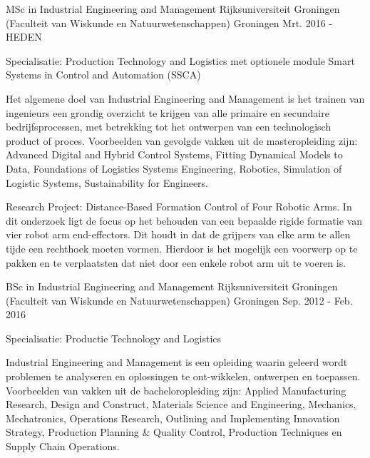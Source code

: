 

\begin{cventries}

  \cventry
    {MSc in Industrial Engineering and Management} %
    {Rijksuniversiteit Groningen (Faculteit van Wiskunde en Natuurwetenschappen)} %
    {Groningen} %
    {Mrt. 2016 - HEDEN} %
    {
      \begin{cvitems} %
        \item {Specialisatie: Production Technology and Logistics met optionele module Smart Systems in Control and Automation (SSCA)}
        \item {Het algemene doel van Industrial Engineering and Management is het trainen van ingenieurs een grondig overzicht te krijgen van alle primaire en secundaire bedrijfsprocessen, met betrekking tot het ontwerpen van een technologisch product of proces. Voorbeelden van gevolgde vakken uit de masteropleiding zijn: Advanced Digital and Hybrid Control Systems, Fitting Dynamical Models to Data, Foundations of Logistics Systems Engineering, Robotics, Simulation of Logistic Systems, Sustainability for Engineers.}
        \item {Research Project: Distance-Based Formation Control of Four Robotic Arms. In dit onderzoek ligt de focus op het behouden van een bepaalde rigide formatie van vier robot arm end-effectors. Dit houdt in dat de grijpers van elke arm te allen tijde een rechthoek moeten vormen. Hierdoor is het mogelijk een voorwerp op te pakken en te verplaatsten dat niet door een enkele robot arm uit te voeren is. }
      \end{cvitems}
    }

  \cventry
    {BSc in Industrial Engineering and Management} %
    {Rijksuniversiteit Groningen (Faculteit van Wiskunde en Natuurwetenschappen)} %
    {Groningen} %
    {Sep. 2012 - Feb. 2016} %
    {
      \begin{cvitems} %
        \item {Specialisatie: Productie Technology and Logistics}
        \item {Industrial Engineering and Management is een opleiding waarin geleerd wordt problemen te analyseren en oplossingen te ont-wikkelen, ontwerpen en toepassen. Voorbeelden van vakken uit de bacheloropleiding zijn: Applied Manufacturing Research, Design and Construct, Materials Science and Engineering, Mechanics, Mechatronics, Operations Research, Outlining and Implementing Innovation Strategy, Production Planning \& Quality Control, Production Techniques en Supply Chain Operations.}
      \end{cvitems}
    }


\end{cventries}
